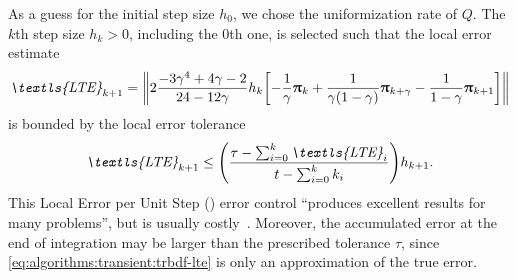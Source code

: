 As a guess for the initial step size $h_0$, we chose the
uniformization rate of $Q$. The $k$th step size $h_k > 0$, including
the $0$th one, is selected such that the local error estimate
\begin{equation}
  \label{eq:algorithms:transient:trbdf-lte}
  \textit{\textls{LTE}}_{k + 1} = \mleft\| 2 \frac{-3\gamma^4 + 4\gamma - 2}{24 -
    12\gamma} h_k \mleft[ -\frac{1}{\gamma} \vec{\uppi}_k +
  \frac{1}{\gamma (1 - \gamma)} \vec{\uppi}_{k + \gamma} - \frac{1}{1
    - \gamma} \vec{\uppi}_{k + 1} \mright] \mright\|
\end{equation}
is bounded by the local error tolerance
\begin{equation}
  \textit{\textls{LTE}}_{k + 1} \le \mleft( \frac{ \tau - \sum_{i = 0}^k
    \textit{\textls{LTE}}_{i} }{ t - \sum_{i = 0}^k k_i } \mright) h_{k + 1}
  \text.
\end{equation}
This Local Error per Unit Step () error control
\enquote{produces excellent results for many problems}, but is usually
costly~\citep{DBLP:journals/cor/ReibmanT88}. Moreover, the accumulated
error at the end of integration may be larger than the prescribed
tolerance $\tau$, since \vref{eq:algorithms:transient:trbdf-lte} is
only an approximation of the true error.

